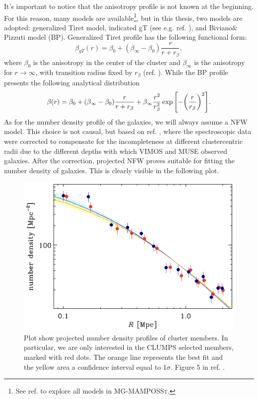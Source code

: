 It's important to notice that the anisotropy profile is not known at the beginning. For this reason, many models are available\footnote{See ref. \cite{pizzuti2022mgmamposstcodetestgravity} to explore all models in \textsc{MG-MAMPOSSt.}}, but in this thesis, two models are adopted: generalized Tiret model, indicated gT (see e.g. ref. \cite{Mamon_2019}), and Biviano$\&$Pizzuti model (BP). Generalized Tiret profile has the following functional form:
\begin{equation} \label{gT model}
    \beta_{gT}(r) = \beta_0 + (\beta_\infty - \beta_0) \frac{r}{r + r_\beta},
\end{equation}
where $\beta_0$ is the anisotropy in the center of the cluster and $\beta_\infty$ is the anisotropy for $r\to\infty$, with transition radius fixed by $r_\beta$ (ref. \cite{pizzuti2022mgmamposstcodetestgravity}). While the BP profile presents the following analytical distribution
\begin{equation} \label{BP model}
    \beta(r) = \beta_0 + (\beta_\infty - \beta_0) \frac{r}{r+r_\beta} + \beta_\infty \frac{r^2}{r^2 _\beta} \exp \qty[-\qty(\frac{r}{r_\beta})^2].
\end{equation}
As for the number density profile of the galaxies, we will always assume a NFW model. This choice is not causal, but based on ref. \cite{CLASH-VLT:-The-Inner-Slope-of-the-MACS-J1206.2-0847-Dark-Matter-Density-Profile}, where the spectroscopic data were corrected to compensate for the incompleteness at different clustercentric radii due to the different depths with which VIMOS and MUSE observed galaxies. After the correction, projected NFW proves suitable for fitting the number density of galaxies. This is clearly visible in the following plot.
\begin{figure}[h!]
    \centering
    \includegraphics[width=0.6\linewidth]{Images/Chapter4/Number density MG-MAMPOSSt.png}
    \caption[Fit for number density density for MACS 1206]{Plot show projected number density profiles of cluster members. In particular, we are only interested in the CLUMPS selected members, marked with red dots. The orange line represents the best fit and the yellow area a confidence interval equal to 1$\sigma$. Figure 5 in ref. \cite{CLASH-VLT:-The-Inner-Slope-of-the-MACS-J1206.2-0847-Dark-Matter-Density-Profile}.}
    \label{fig:number density profile fit MACS 1206}
\end{figure}

